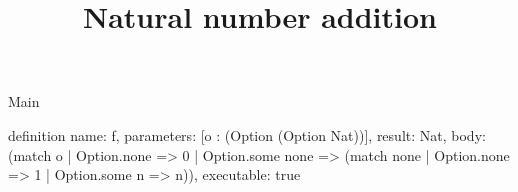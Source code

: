 \begin{lexlean}{Main}
\title{Natural number addition}
\begin{semanticmodule}
definition{
  name: f,
  parameters: [o : (Option (Option Nat))],
  result: Nat,
  body: (match o
    | Option.none => 0
    | Option.some none => (match none | Option.none => 1 | Option.some n => n)),
  executable: true
}
\end{semanticmodule}
\end{lexlean}
